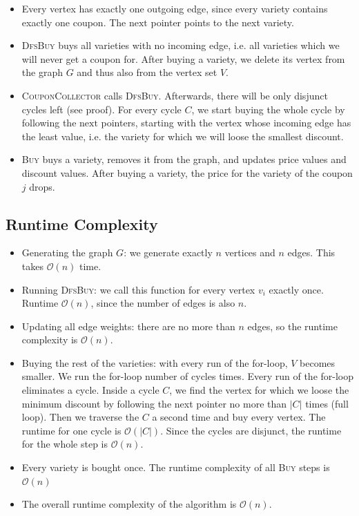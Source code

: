 \documentclass[12pt]{article}
\begin{document}
\begin{itemize}
	\item Every vertex has exactly one outgoing edge, since every variety contains exactly one coupon. The $\mbox{next}$ pointer points to the next variety.
	\item \textsc{DfsBuy} buys all varieties with no incoming edge, i.e. all varieties which we will never get a coupon for. After buying a variety, we delete its vertex from the graph $G$ and thus also from the vertex set $V$.
	\item \textsc{CouponCollector} calls \textsc{DfsBuy}. Afterwards, there will be only disjunct cycles left (see proof). For every cycle $C$, we start buying the whole cycle by following the $\mbox{next}$ pointers, starting with the vertex whose incoming edge has the least value, i.e. the variety for which we will loose the smallest discount.
	\item \textsc{Buy} buys a variety, removes it from the graph, and updates price values and discount values. After buying a variety, the price for the variety of the coupon $j$ drops.
\end{itemize}

\subsection*{Runtime Complexity}
\begin{itemize}
	\item Generating the graph $G$: we generate exactly $n$ vertices and $n$ edges. This takes $\mathcal{O}(n)$ time.
	\item Running \textsc{DfsBuy}: we call this function for every vertex $v_i$ exactly once. Runtime $\mathcal{O}(n)$, since the number of edges is also $n$.
	\item Updating all edge weights: there are no more than $n$ edges, so the runtime complexity is $\mathcal{O}(n)$.
	\item Buying the rest of the varieties: with every run of the for-loop, $V$ becomes smaller. We run the for-loop number of cycles times. Every run of the for-loop eliminates a cycle. Inside a cycle $C$, we find the vertex for which we loose the minimum discount by following the next pointer no more than $|C|$ times (full loop). Then we traverse the $C$ a second time and buy every vertex. The runtime for one cycle is $\mathcal{O}(|C|)$. Since the cycles are disjunct, the runtime for the whole step is $\mathcal{O}(n)$.
	\item Every variety is bought once. The runtime complexity of all \textsc{Buy} steps is $\mathcal{O}(n)$
	\item The overall runtime complexity of the algorithm is $\mathcal{O}(n)$.
\end{itemize}
\end{document}
